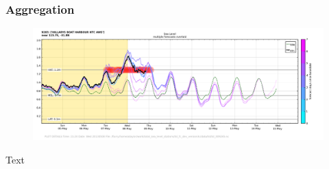 \begin{frame}
\frametitle{Aggregation}
\begin{minipage}{0.45\textwidth}
    \begin{figure}      
    \includegraphics[width=\textwidth]{figures/plots/aggregate_fc_plot_009265.png}
    \end{figure}
\end{minipage}
\hfill
\begin{minipage}{0.45\textwidth}
    Text
\end{minipage}
\end{frame}